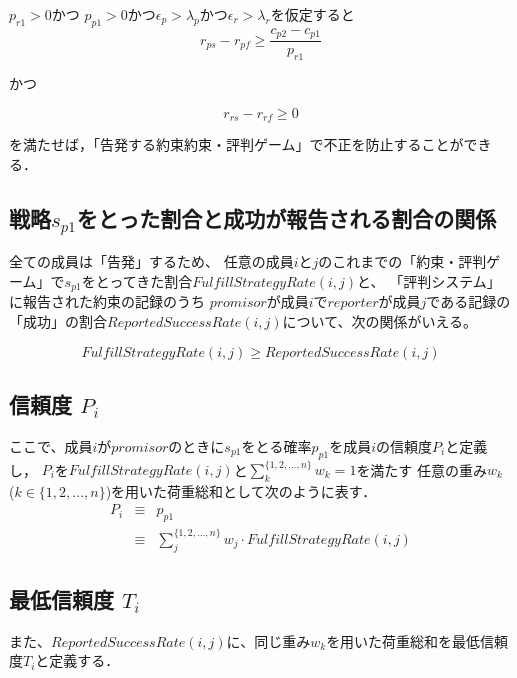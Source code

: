 $p_{r1} > 0$かつ $p_{p1} > 0$かつ$ \epsilon_p > \lambda_p $かつ$ \epsilon_r > \lambda_r $を仮定すると\\

\begin{equation}
  r_{ps} - r_{pf} \geq \frac{c_{p2} - c_{p1}}{p_{r1} } \label{conditionByPr1}
\end{equation}

かつ

\begin{equation}
  r_{rs} - r_{rf} \geq 0
\end{equation}

を満たせば，「告発する約束約束・評判ゲーム」で不正を防止することができる．

\subsection{戦略$s_{p1}$をとった割合と成功が報告される割合の関係}
全ての成員は「告発」するため、
任意の成員$i$と$j$のこれまでの「約束・評判ゲーム」で$s_{p1}$をとってきた割合$FulfillStrategyRate(i, j)$と、
「評判システム」に報告された約束の記録のうち
$promisor$が成員$i$で$reporter$が成員$j$である記録の「成功」の割合$ReportedSuccessRate(i, j)$について、次の関係がいえる。

\begin{equation}
  FulfillStrategyRate(i, j) \geq ReportedSuccessRate(i, j) \label{inequalityFR}
\end{equation}


\subsection{信頼度 $ P_i $}

ここで、成員$i$が$promisor$のときに$s_{p1}$をとる確率$ p_{p1} $を成員$i$の信頼度$P_i$と定義し，
$ P_i $を$FulfillStrategyRate(i, j)$と$\sum^{\{1, 2, ..., n\}}_{k}w_k = 1$を満たす
任意の重み$ w_k $ ($k \in \{1, 2, ..., n\}$)を用いた荷重総和として次のように表す． \\

\begin{eqnarray}
  P_i &\equiv& p_{p1} \\
      &\equiv& \sum^{\{1,2,..., n\}}_{j} w_{j} \cdot FulfillStrategyRate(i, j)
\end{eqnarray}


\subsection{最低信頼度 $ T_i $}
また、$ ReportedSuccessRate(i, j)$に、同じ重み$ w_k $を用いた荷重総和を最低信頼度$ T_i $と定義する． \\

